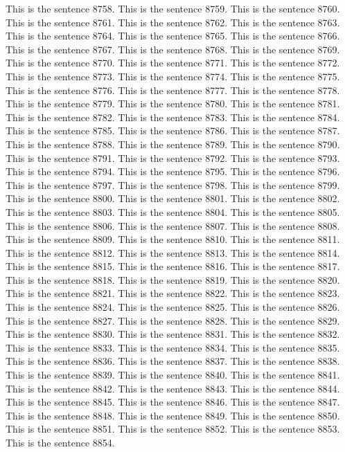 \documentclass{article}
\begin{document}
This is the sentence 8758.
This is the sentence 8759.
This is the sentence 8760.
This is the sentence 8761.
This is the sentence 8762.
This is the sentence 8763.
This is the sentence 8764.
This is the sentence 8765.
This is the sentence 8766.
This is the sentence 8767.
This is the sentence 8768.
This is the sentence 8769.
This is the sentence 8770.
This is the sentence 8771.
This is the sentence 8772.
This is the sentence 8773.
This is the sentence 8774.
This is the sentence 8775.
This is the sentence 8776.
This is the sentence 8777.
This is the sentence 8778.
This is the sentence 8779.
This is the sentence 8780.
This is the sentence 8781.
This is the sentence 8782.
This is the sentence 8783.
This is the sentence 8784.
This is the sentence 8785.
This is the sentence 8786.
This is the sentence 8787.
This is the sentence 8788.
This is the sentence 8789.
This is the sentence 8790.
This is the sentence 8791.
This is the sentence 8792.
This is the sentence 8793.
This is the sentence 8794.
This is the sentence 8795.
This is the sentence 8796.
This is the sentence 8797.
This is the sentence 8798.
This is the sentence 8799.
This is the sentence 8800.
This is the sentence 8801.
This is the sentence 8802.
This is the sentence 8803.
This is the sentence 8804.
This is the sentence 8805.
This is the sentence 8806.
This is the sentence 8807.
This is the sentence 8808.
This is the sentence 8809.
This is the sentence 8810.
This is the sentence 8811.
This is the sentence 8812.
This is the sentence 8813.
This is the sentence 8814.
This is the sentence 8815.
This is the sentence 8816.
This is the sentence 8817.
This is the sentence 8818.
This is the sentence 8819.
This is the sentence 8820.
This is the sentence 8821.
This is the sentence 8822.
This is the sentence 8823.
This is the sentence 8824.
This is the sentence 8825.
This is the sentence 8826.
This is the sentence 8827.
This is the sentence 8828.
This is the sentence 8829.
This is the sentence 8830.
This is the sentence 8831.
This is the sentence 8832.
This is the sentence 8833.
This is the sentence 8834.
This is the sentence 8835.
This is the sentence 8836.
This is the sentence 8837.
This is the sentence 8838.
This is the sentence 8839.
This is the sentence 8840.
This is the sentence 8841.
This is the sentence 8842.
This is the sentence 8843.
This is the sentence 8844.
This is the sentence 8845.
This is the sentence 8846.
This is the sentence 8847.
This is the sentence 8848.
This is the sentence 8849.
This is the sentence 8850.
This is the sentence 8851.
This is the sentence 8852.
This is the sentence 8853.
This is the sentence 8854.
\end{document}
